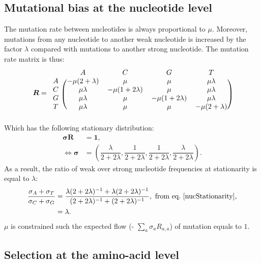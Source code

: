 \documentclass{article}
\newcommand{\UniDimArray}[1]{\bm{#1}} %
\newcommand{\BiDimArray}[1]{\bm{#1}} %
\newcommand{\vecOne}{\UniDimArray{1}} %
\newcommand{\mutmatrix}{R} %
\newcommand{\Mutmatrix}{\BiDimArray{\mutmatrix}} %
\newcommand{\mutequi}{\sigma} %
\newcommand{\Mutequi}{\UniDimArray{\mutequi}} %
\begin{document}
\subsection{Mutational bias at the nucleotide level}
\label{sec:mut-bias-mut-matrix}
The mutation rate between nucleotides is always proportional to $\mu$.
Moreover, mutations from any nucleotide to another weak nucleotide is increased by the factor $\lambda$ compared with mutations to another strong nucleotide.
The mutation rate matrix is thus:
\begin{equation}
 \label{nucMatrix}
 \Mutmatrix =
 \begin{blockarray}{ccccc}
 & A & C & G & T \\
 \begin{block}{c(cccc)}
 A & {-\mu(2 + \lambda)} & {\mu} & {\mu} & {\mu \lambda} \\
 C & {\mu \lambda} & {-\mu(1 + 2\lambda)} & {\mu} & {\mu \lambda} \\
 G & {\mu \lambda} & {\mu} & {-\mu(1 + 2\lambda)} & {\mu \lambda} \\
 T & {\mu \lambda} & {\mu} & {\mu} & {-\mu(2 + \lambda)} \\
 \end{block}
 \end{blockarray}
\end{equation}
Which has the following stationary distribution:
\begin{align}
 \Mutequi \Mutmatrix & = \vecOne, \\
 \iff \Mutequi & = \left( \dfrac{\lambda}{2+2\lambda}, \dfrac{1}{2+2\lambda}, \dfrac{1}{2+2\lambda}, \dfrac{\lambda}{2+2\lambda} \right).
 \label{nucStationarity}
\end{align}
As a result, the ratio of weak over strong nucleotide frequencies at stationarity is equal to $\lambda$:
\begin{align}
 \label{lambda}
 \dfrac{ \mutequi_A + \mutequi_T }{ \mutequi_C + \mutequi_G }
 & = \dfrac{ \lambda ( 2 + 2 \lambda)^{-1} + \lambda ( 2 + 2 \lambda)^{-1}}{ ( 2 + 2 \lambda)^{-1} + ( 2 + 2 \lambda)^{-1}}, \ \text{from eq.~\ref{nucStationarity},}\\
 & = \lambda.
\end{align}
$\mu$ is constrained such the expected flow (- $\sum_{a} \mutequi_a \mutmatrix_{a, a} $) of mutation equals to $1$.

\subsection{Selection at the amino-acid level}
\label{sec:mut-bias-aa-selection}
\end{document}
